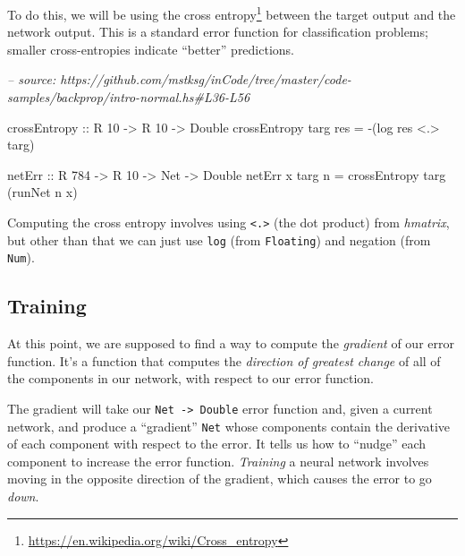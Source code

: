 \documentclass[]{article}
\newenvironment{Shaded}{}{}
\newcommand{\CommentTok}[1]{\textcolor[rgb]{0.38,0.63,0.69}{\textit{#1}}}
\newcommand{\DataTypeTok}[1]{\textcolor[rgb]{0.56,0.13,0.00}{#1}}
\newcommand{\DecValTok}[1]{\textcolor[rgb]{0.25,0.63,0.44}{#1}}
\newcommand{\FunctionTok}[1]{\textcolor[rgb]{0.02,0.16,0.49}{#1}}
\newcommand{\NormalTok}[1]{#1}
\newcommand{\OtherTok}[1]{\textcolor[rgb]{0.00,0.44,0.13}{#1}}
\renewcommand{\href}[2]{#2\footnote{\url{#1}}}
\begin{document}
To do this, we will be using the
\href{https://en.wikipedia.org/wiki/Cross_entropy}{cross entropy} between the
target output and the network output. This is a standard error function for
classification problems; smaller cross-entropies indicate ``better''
predictions.

\begin{Shaded}
\begin{Highlighting}[]
\CommentTok{-- source: https://github.com/mstksg/inCode/tree/master/code-samples/backprop/intro-normal.hs#L36-L56}

\NormalTok{crossEntropy}
\OtherTok{    ::} \DataTypeTok{R} \DecValTok{10}
    \OtherTok{->} \DataTypeTok{R} \DecValTok{10}
    \OtherTok{->} \DataTypeTok{Double}
\NormalTok{crossEntropy targ res }\FunctionTok{=} \FunctionTok{-}\NormalTok{(log res }\FunctionTok{<.>}\NormalTok{ targ)}

\NormalTok{netErr}
\OtherTok{    ::} \DataTypeTok{R} \DecValTok{784}
    \OtherTok{->} \DataTypeTok{R} \DecValTok{10}
    \OtherTok{->} \DataTypeTok{Net}
    \OtherTok{->} \DataTypeTok{Double}
\NormalTok{netErr x targ n }\FunctionTok{=}\NormalTok{ crossEntropy targ (runNet n x)}
\end{Highlighting}
\end{Shaded}

Computing the cross entropy involves using \texttt{\textless{}.\textgreater{}}
(the dot product) from \emph{hmatrix}, but other than that we can just use
\texttt{log} (from \texttt{Floating}) and negation (from \texttt{Num}).

\hypertarget{training}{%
\subsection{Training}\label{training}}

At this point, we are supposed to find a way to compute the \emph{gradient} of
our error function. It's a function that computes the \emph{direction of
greatest change} of all of the components in our network, with respect to our
error function.

The gradient will take our \texttt{Net\ -\textgreater{}\ Double} error function
and, given a current network, and produce a ``gradient'' \texttt{Net} whose
components contain the derivative of each component with respect to the error.
It tells us how to ``nudge'' each component to increase the error function.
\emph{Training} a neural network involves moving in the opposite direction of
the gradient, which causes the error to go \emph{down}.
\end{document}
